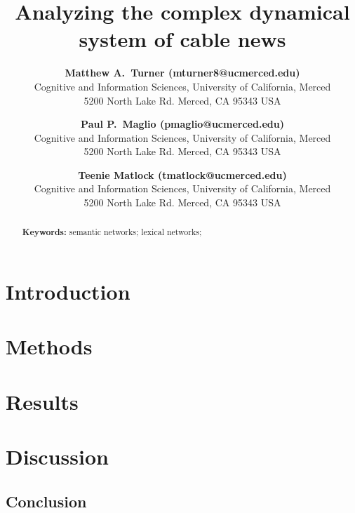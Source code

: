 \documentclass[11pt,letterpaper]{article}
\title{Analyzing the complex dynamical system of cable news}
\author{{\large \bf Matthew A.~Turner (mturner8@ucmerced.edu)} \\
  Cognitive and Information Sciences, University of California, Merced \\
  5200 North Lake Rd. Merced, CA 95343 USA
  \and {\large \bf Paul P.~Maglio (pmaglio@ucmerced.edu)} \\
  Cognitive and Information Sciences, University of California, Merced \\
  5200 North Lake Rd. Merced, CA 95343 USA
  \and
  {\large \bf Teenie Matlock (tmatlock@ucmerced.edu)} \\
  Cognitive and Information Sciences, University of California, Merced \\
  5200 North Lake Rd. Merced, CA 95343 USA
}
\begin{document}
\maketitle


\begin{abstract}


\textbf{Keywords:}
semantic networks; lexical networks; 
\end{abstract}

\section{Introduction}



\section{Methods}

%

\section{Results}



\section{Discussion}

\subsection{Conclusion}



\setlength{\bibleftmargin}{.125in}
\setlength{\bibindent}{-\bibleftmargin}


\end{document}
